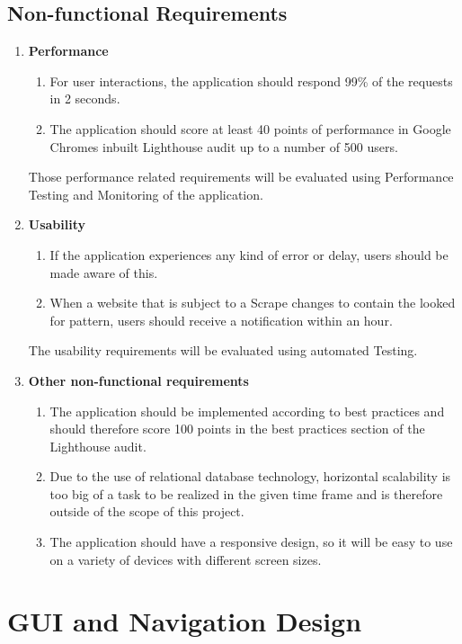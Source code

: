 \documentclass[titlepage, 12pt]{article}
\begin{document}
\subsection{Non-functional Requirements}

\begin{enumerate}
  \item \textbf{Performance}
        \begin{enumerate}
          \item For user interactions, the application should respond 99\% of the requests in 2 seconds.
          \item The application should score at least 40 points of performance in Google Chromes inbuilt Lighthouse audit up to a number of 500 users.
        \end{enumerate}
        Those performance related requirements will be evaluated using Performance Testing and Monitoring of the application.
  \item \textbf{Usability}
        \begin{enumerate}
          \item If the application experiences any kind of error or delay, users should be made aware of this.
          \item When a website that is subject to a Scrape changes to contain the looked for pattern, users should receive a notification within an hour.
        \end{enumerate}
        The usability requirements will be evaluated using automated Testing.
  \item \textbf{Other non-functional requirements}
        \begin{enumerate}
          \item The application should be implemented according to best practices and should therefore score 100 points in the best practices section of the Lighthouse audit.
          \item Due to the use of relational database technology, horizontal scalability is too big of a task to be realized in the given time frame and is therefore outside of the scope of this project.
          \item The application should have a responsive design, so it will be easy to use on a variety of devices with different screen sizes.
        \end{enumerate}
\end{enumerate}

\section{GUI and Navigation Design}
\end{document}
